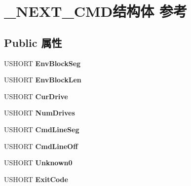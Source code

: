 \hypertarget{struct___n_e_x_t___c_m_d}{}\section{\+\_\+\+N\+E\+X\+T\+\_\+\+C\+M\+D结构体 参考}
\label{struct___n_e_x_t___c_m_d}
\subsection*{Public 属性}
\begin{DoxyCompactItemize}
\item 
\mbox{\label{struct___n_e_x_t___c_m_d_ab4eb8c2e9f1c2fa7eebca3f5f3df0e41}} 
U\+S\+H\+O\+RT {\bfseries Env\+Block\+Seg}
\item 
\mbox{\label{struct___n_e_x_t___c_m_d_a6d80ad610634457ce00cd52525069629}} 
U\+S\+H\+O\+RT {\bfseries Env\+Block\+Len}
\item 
\mbox{\label{struct___n_e_x_t___c_m_d_aed1640c7d220d4ef7c82a84503150b3d}} 
U\+S\+H\+O\+RT {\bfseries Cur\+Drive}
\item 
\mbox{\label{struct___n_e_x_t___c_m_d_a45cdee536d03b177ae12cc7c0075a116}} 
U\+S\+H\+O\+RT {\bfseries Num\+Drives}
\item 
\mbox{\label{struct___n_e_x_t___c_m_d_a81e42a24b10ed9ea8c0b38a2e911e2c4}} 
U\+S\+H\+O\+RT {\bfseries Cmd\+Line\+Seg}
\item 
\mbox{\label{struct___n_e_x_t___c_m_d_ad9447f313d3e964429357ce84941f429}} 
U\+S\+H\+O\+RT {\bfseries Cmd\+Line\+Off}
\item 
\mbox{\label{struct___n_e_x_t___c_m_d_a0f8ca95f430c5c451ff83f69a05772da}} 
U\+S\+H\+O\+RT {\bfseries Unknown0}
\item 
\mbox{\label{struct___n_e_x_t___c_m_d_aab949f8e025923f5150440488b2722e1}} 
U\+S\+H\+O\+RT {\bfseries Exit\+Code}
\item 
\mbox{\label{struct___n_e_x_t___c_m_d_a70c5a47add29c3923859abd79005aa50}} 

\end{DoxyCompactItemize}
